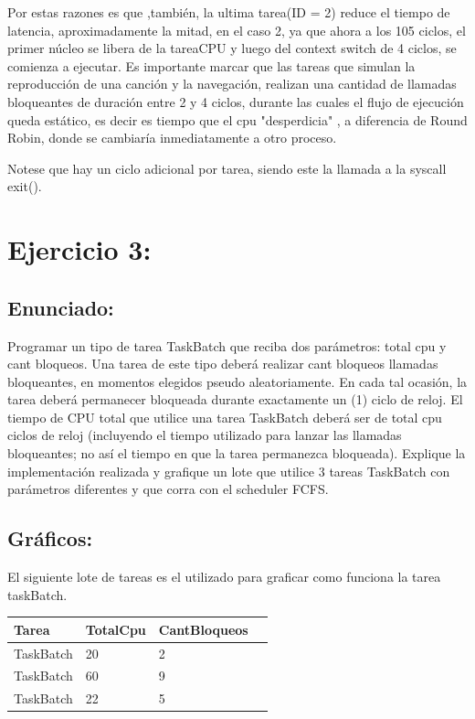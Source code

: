 \documentclass[10pt, a4paper]{article}
\begin{document}
Por estas razones es que ,también, la ultima tarea(ID = 2) reduce el tiempo de latencia, aproximadamente la mitad, en el caso 2, ya que ahora a los 105 ciclos, el primer núcleo se libera de la tareaCPU y luego del context switch de 4 ciclos, se comienza a ejecutar.
Es importante marcar que las tareas que simulan la reproducción de una canción y la navegación, realizan una cantidad de llamadas bloqueantes de duración entre 2 y 4 ciclos, durante las cuales el flujo de ejecución queda estático, es decir es tiempo que el cpu "desperdicia" , a diferencia de Round Robin, donde se cambiaría inmediatamente a otro proceso.

Notese que hay un ciclo adicional por tarea, siendo este la llamada a la syscall exit().
\section{Ejercicio 3:}

\subsection{Enunciado:}

Programar un tipo de tarea TaskBatch que reciba dos parámetros: total cpu y
cant bloqueos. Una tarea de este tipo deberá realizar cant bloqueos llamadas bloqueantes, en
momentos elegidos pseudo aleatoriamente. En cada tal ocasión, la tarea deberá permanecer
bloqueada durante exactamente un (1) ciclo de reloj. El tiempo de CPU total que utilice una
tarea TaskBatch deberá ser de total cpu ciclos de reloj (incluyendo el tiempo utilizado para
lanzar las llamadas bloqueantes; no así el tiempo en que la tarea permanezca bloqueada).
Explique la implementación realizada y grafique un lote que utilice 3 tareas TaskBatch con
parámetros diferentes y que corra con el scheduler FCFS.
\subsection{Gráficos:}

El siguiente lote de tareas es el utilizado para graficar como funciona la tarea taskBatch.

\begin{center}
\begin{tabular}{| l | l | l | l |}
    \hline
   Tarea & TotalCpu & CantBloqueos \\ \hline
  TaskBatch & 20 & 2 \\ \hline
TaskBatch & 60 & 9 \\ \hline
TaskBatch & 22 & 5 \\ \hline

\end{tabular}
\end{center}
\end{document}
